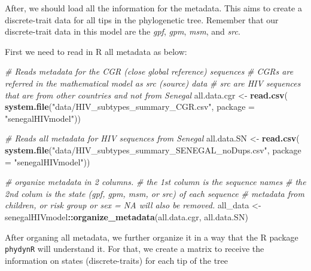 \documentclass[12pt,]{article}
\newenvironment{Shaded}{\begin{snugshade}}{\end{snugshade}}
\newcommand{\CommentTok}[1]{\textcolor[rgb]{0.56,0.35,0.01}{\textit{#1}}}
\newcommand{\DataTypeTok}[1]{\textcolor[rgb]{0.13,0.29,0.53}{#1}}
\newcommand{\KeywordTok}[1]{\textcolor[rgb]{0.13,0.29,0.53}{\textbf{#1}}}
\newcommand{\NormalTok}[1]{#1}
\newcommand{\OperatorTok}[1]{\textcolor[rgb]{0.81,0.36,0.00}{\textbf{#1}}}
\newcommand{\StringTok}[1]{\textcolor[rgb]{0.31,0.60,0.02}{#1}}
\begin{document}
After, we should load all the information for the metadata. This aims to
create a discrete-trait data for all tips in the phylogenetic tree.
Remember that our discrete-trait data in this model are the \emph{gpf},
\emph{gpm}, \emph{msm}, and \emph{src}.

First we need to read in R all metadata as below:

\begin{Shaded}
\begin{Highlighting}[]
\CommentTok{# Reads metadata for the CGR (close global reference) sequences}
\CommentTok{# CGRs are referred in the mathematical model as src (source) data}
\CommentTok{# src are HIV sequences that are from other countries and not from Senegal}
\NormalTok{all.data.cgr <-}\StringTok{ }\KeywordTok{read.csv}\NormalTok{(}
  \KeywordTok{system.file}\NormalTok{(}\StringTok{"data/HIV_subtypes_summary_CGR.csv"}\NormalTok{, }
  \DataTypeTok{package =} \StringTok{"senegalHIVmodel"}\NormalTok{))}

\CommentTok{# Reads all metadata for HIV sequences from Senegal}
\NormalTok{all.data.SN <-}\StringTok{ }\KeywordTok{read.csv}\NormalTok{(}
  \KeywordTok{system.file}\NormalTok{(}\StringTok{"data/HIV_subtypes_summary_SENEGAL_noDups.csv"}\NormalTok{, }
  \DataTypeTok{package =} \StringTok{"senegalHIVmodel"}\NormalTok{))}

\CommentTok{# organize metadata in 2 columns.}
\CommentTok{# the 1st column is the sequence names}
\CommentTok{# the 2nd colum is the state (gpf, gpm, msm, or src) of each sequence}
\CommentTok{# metadata from children, or risk group or sex = NA will also be removed. }
\NormalTok{all_data <-}\StringTok{ }\NormalTok{senegalHIVmodel}\OperatorTok{::}\KeywordTok{organize_metadata}\NormalTok{(all.data.cgr, all.data.SN)}
\end{Highlighting}
\end{Shaded}

After organing all metadata, we further organize it in a way that the R
package \texttt{phydynR} will understand it. For that, we create a
matrix to receive the information on states (discrete-traits) for each
tip of the tree
\end{document}
